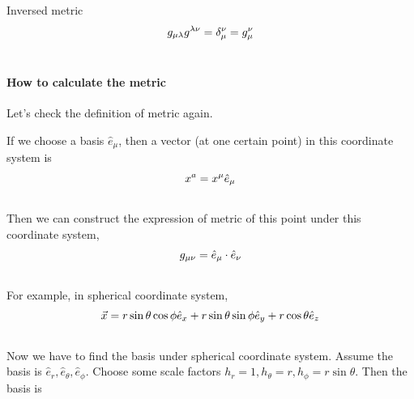 \documentclass[letterpaper,10pt,english]{sphinxmanual}
\begin{document}
Inversed metric
\begin{gather}
\begin{split}g_{\mu\lambda}g^{\lambda\nu}=\delta_\mu^\nu = g_\mu^\nu\end{split}\notag\\\begin{split}\end{split}\notag
\end{gather}

\paragraph{How to calculate the metric}
\label{math:how-to-calculate-the-metric}
Let's check the definition of metric again.

If we choose a basis $\hat e_\mu$, then a vector (at one certain point) in this coordinate system is
\begin{gather}
\begin{split}x^a=x^\mu \hat e_\mu\end{split}\notag\\\begin{split}\end{split}\notag
\end{gather}
Then we can construct the expression of metric of this point under this coordinate system,
\begin{gather}
\begin{split}g_{\mu\nu}=\hat e_\mu\cdot \hat e_\nu\end{split}\notag\\\begin{split}\end{split}\notag
\end{gather}
For example, in spherical coordinate system,
\label{math:equation-EQrelativityMetricPoint}\begin{gather}
\begin{split}\vec x=r\sin \theta\cos\phi \hat e_x+r\sin\theta\sin\phi \hat e_y+r\cos\theta \hat e_z\end{split}\label{math-EQrelativityMetricPoint}\\\begin{split}\end{split}\notag
\end{gather}
Now we have to find the basis under spherical coordinate system. Assume the basis is $\hat e_r, \hat e_\theta, \hat e_\phi$. Choose some scale factors $h_r=1, h_\theta=r, h_\phi=r\sin\theta$. Then the basis is
\end{document}
